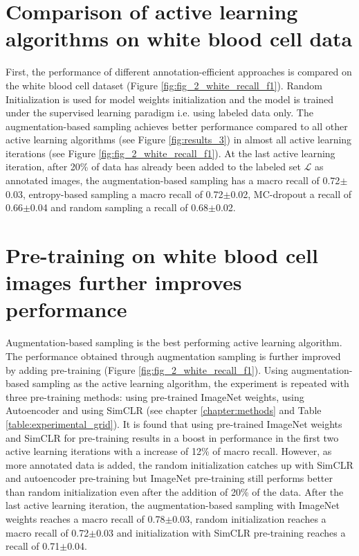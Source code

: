 \section{Comparison of active learning algorithms on white blood cell data}
First, the performance of different annotation-efficient approaches is compared on the white blood cell dataset (Figure \ref{fig:fig_2_white_recall_f1}). Random Initialization is used for model weights initialization and the model is trained under the supervised learning paradigm i.e. using labeled data only. The augmentation-based sampling achieves better performance compared to all other active learning algorithms (see Figure \ref{fig:results_3}) in almost all active learning iterations (see Figure \ref{fig:fig_2_white_recall_f1}). At the last active learning iteration, after 20\% of data has already been added to the labeled set $\mathcal{L}$ as annotated images, the augmentation-based sampling has a macro recall of 0.72$\pm$0.03, entropy-based sampling a macro recall of 0.72$\pm$0.02, MC-dropout a recall of 0.66$\pm$0.04 and random sampling a recall of 0.68$\pm$0.02.

\section{Pre-training on white blood cell images further improves performance}
Augmentation-based sampling is the best performing active learning algorithm. The performance obtained through augmentation sampling is further improved by adding pre-training (Figure \ref{fig:fig_2_white_recall_f1}). Using augmentation-based sampling as the active learning algorithm, the experiment is repeated with three pre-training methods: using pre-trained ImageNet weights, using Autoencoder and using SimCLR (see chapter \ref{chapter:methods} and Table \ref{table:experimental_grid}). It is found that using pre-trained ImageNet  weights and SimCLR for pre-training results in a boost in performance in the first two active learning iterations with a increase of 12\% of macro recall. However, as more annotated data is added, the random initialization catches up with SimCLR and autoencoder pre-training but ImageNet pre-training still performs better than random initialization even after the addition of 20\% of the data. After the last active learning iteration, the  augmentation-based sampling with ImageNet weights reaches a macro recall of 0.78$\pm$0.03, random initialization reaches a macro recall of 0.72$\pm$0.03 and initialization with SimCLR pre-training reaches a recall of 0.71$\pm$0.04.

